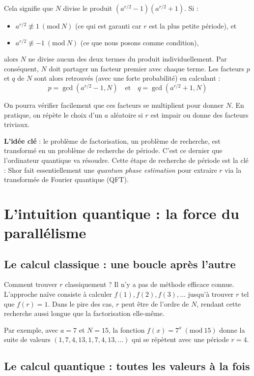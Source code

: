 \documentclass[11pt,a4paper]{article}
\newcommand{\Mod}[1]{\ (\mathrm{mod}\ #1)}
\begin{document}
Cela signifie que $N$ divise le produit $(a^{r/2} - 1)(a^{r/2} + 1)$. Si :
\begin{itemize}
\item $a^{r/2} \not\equiv 1 \Mod{N}$ (ce qui est garanti car $r$ est la plus petite période), et
\item $a^{r/2} \not\equiv -1 \Mod{N}$ (ce que nous posons comme condition),
\end{itemize}

alors $N$ ne divise aucun des deux termes du produit individuellement. Par conséquent, $N$ doit partager un facteur premier avec chaque terme. Les facteurs $p$ et $q$ de $N$ sont alors retrouvés (avec une forte probabilité) en calculant :
\[p = \gcd(a^{r/2} - 1, N) \quad \text{et} \quad q = \gcd(a^{r/2} + 1, N)\]

On pourra vérifier facilement que ces facteurs se multiplient pour donner $N$. En pratique, on répète le choix d'un $a$ aléatoire si $r$ est impair ou donne des facteurs triviaux.

\textbf{L'idée clé} : le problème de factorisation, un problème de recherche, est transformé en un problème de recherche de période. C'est ce dernier que l'ordinateur quantique va résoudre. Cette étape de recherche de période est la clé : Shor fait essentiellement une \textit{quantum phase estimation} pour extraire $r$ via la transformée de Fourier quantique (QFT).

\section{L'intuition quantique : la force du parallélisme}

\subsection{Le calcul classique : une boucle après l'autre}

Comment trouver $r$ classiquement ? Il n'y a pas de méthode efficace connue. L'approche naïve consiste à calculer $f(1), f(2), f(3), \ldots$ jusqu'à trouver $r$ tel que $f(r) = 1$. Dans le pire des cas, $r$ peut être de l'ordre de $N$, rendant cette recherche aussi longue que la factorisation elle-même.

Par exemple, avec $a = 7$ et $N = 15$, la fonction $f(x) = 7^x \Mod{15}$ donne la suite de valeurs $(1, 7, 4, 13, 1, 7, 4, 13, \ldots)$ qui se répètent avec une période $r = 4$.

\subsection{Le calcul quantique : toutes les valeurs à la fois}
\end{document}
